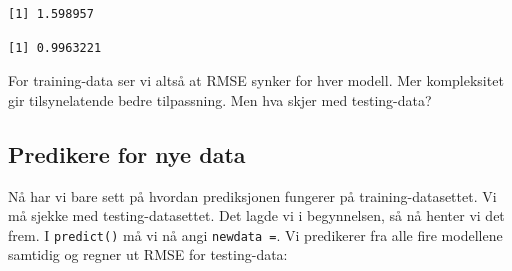 \documentclass[
  letterpaper,
  DIV=11,
  numbers=noendperiod]{scrreprt}
\newenvironment{Shaded}{\begin{snugshade}}{\end{snugshade}}
\newcommand{\DecValTok}[1]{\textcolor[rgb]{0.68,0.00,0.00}{#1}}
\newcommand{\FunctionTok}[1]{\textcolor[rgb]{0.28,0.35,0.67}{#1}}
\newcommand{\NormalTok}[1]{\textcolor[rgb]{0.00,0.23,0.31}{#1}}
\newcommand{\SpecialCharTok}[1]{\textcolor[rgb]{0.37,0.37,0.37}{#1}}
\begin{document}
\begin{Shaded}
\end{Shaded}

\begin{verbatim}
[1] 1.598957
\end{verbatim}

\begin{Shaded}
\end{Shaded}

\begin{verbatim}
[1] 0.9963221
\end{verbatim}

For training-data ser vi altså at RMSE synker for hver modell. Mer
kompleksitet gir tilsynelatende bedre tilpassning. Men hva skjer med
testing-data?

\subsection{Predikere for nye data}\label{predikere-for-nye-data}

Nå har vi bare sett på hvordan prediksjonen fungerer på
training-datasettet. Vi må sjekke med testing-datasettet. Det lagde vi i
begynnelsen, så nå henter vi det frem. I \texttt{predict()} må vi nå
angi \texttt{newdata\ =}. Vi predikerer fra alle fire modellene samtidig
og regner ut RMSE for testing-data:
\end{document}
